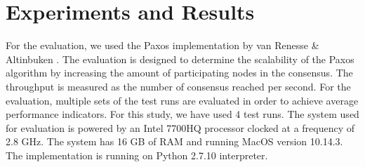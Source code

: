 \documentclass[conference]{IEEEtran}
\begin{document}
\section{Experiments and Results}
For the evaluation, we used the Paxos implementation by van Renesse \& Altinbuken \cite{b3}. 
The evaluation is designed to determine the scalability of the Paxos algorithm by increasing the amount of participating nodes in the consensus. 
The throughput is measured as the number of consensus reached per second. 
For the evaluation, multiple sets of the test runs are evaluated in order to achieve average performance indicators. 
For this study, we have used 4 test runs. 
The system used for evaluation is powered by an Intel 7700HQ processor clocked at a frequency of 2.8 GHz. 
The system has 16 GB of RAM and running MacOS version 10.14.3. 
The implementation is running on Python 2.7.10 interpreter. \\
\end{document}
